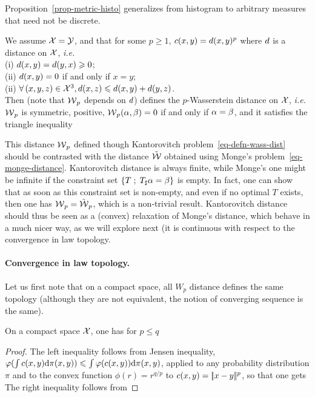 Proposition~\ref{prop-metric-histo} generalizes from histogram to arbitrary measures that need not be discrete.

\begin{prop}\label{prop-metric-measure}
We assume $\mathcal{X}=\mathcal{Y}$, and that for some $p \geq 1$, $c(x,y)=d(x,y)^p$ where $d$ is a distance on $\mathcal{X}$, \emph{i.e.} \\
	\hbox{}\qquad (i) $d(x,y) = d(y,x) \geqslant 0$;  \\
	\hbox{}\qquad (ii)  $d(x,y)=0$ if and only if $x=y$;  \\
	\hbox{}\qquad (ii)  $\forall \, (x,y,z) \in \mathcal{X}^3, d(x,z) \leqslant d(x,y)+d(y,z)$. \\
Then 
(note that $\operatorname{\mathcal{W}}_p$ depends on $d$) defines the $p$-Wasserstein distance on $\mathcal{X}$, \emph{i.e.} $\operatorname{\mathcal{W}}_p$ is symmetric, positive, $\operatorname{\mathcal{W}}_p(\alpha,\beta)=0$ if and only if $\alpha = \beta$, and it satisfies the triangle inequality
\end{prop}

This distance $\operatorname{\mathcal{W}}_p$ defined though Kantorovitch problem~\eqref{eq-defn-wass-dist} should be contrasted with the distance $\tilde{\operatorname{\mathcal{W}}}$ obtained using Monge's problem~\eqref{eq-monge-distance}. Kantorovitch distance is always finite, while Monge's one might be infinite if the constraint set $\left\{ T \;;\; T_\sharp \alpha=\beta \right\}$ is empty. In fact, one can show that as soon as this constraint set is non-empty, and even if no optimal $T$ exists, then one has $\operatorname{\mathcal{W}}_p = \tilde{\operatorname{\mathcal{W}}}_p$, which is a non-trivial result. Kantorovitch distance should thus be seen as a (convex) relaxation of Monge's distance, which behave in a much nicer way, as we will explore next (it is continuous with respect to the convergence in law topology.


\paragraph{Convergence in law topology.}

Let us first note that on a compact space, all $W_p$ distance defines the same topology (although they are not equivalent, the notion of converging sequence is the same).

\begin{prop}\label{prop-comp-wass-p}
	On a compact space $\mathcal{X}$, one has for $p \leq q$
\end{prop}
\begin{proof}
	The left inequality follows from Jensen inequality, $\varphi(\int c(x,y) \mathrm{d}\pi(x,y)) \leqslant \int \varphi(c(x,y)) \mathrm{d}\pi(x,y)$, applied to any probability distribution $\pi$ and to the convex function $\phi(r)=r^{q/p}$ to $c(x,y)=|\!| x-y |\!|^p$, so that one gets
	The right inequality follows from
\end{proof}

